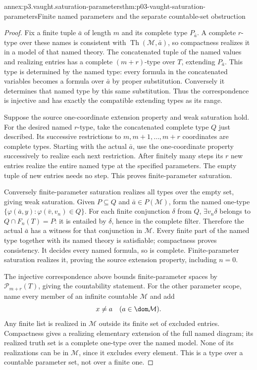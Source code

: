 \begin{annexitem}{annex:p3.vaught.saturation-parameters}{thm:p03-vaught-saturation-parameters}{Finite named parameters and the separate countable-set obstruction}
\begin{proof}
Fix a finite tuple \(\bar a\) of length \(m\) and its complete type
\(P_{\bar a}\). A complete \(r\)-type over these names is consistent
with \(\operatorname{Th}(\mathcal M,\bar a)\), so compactness realizes
it in a model of that named theory. The concatenated tuple of the
named values and realizing entries has a complete \((m+r)\)-type
over \(T\), extending \(P_{\bar a}\).
This type is determined by the named type: every formula in the
concatenated variables becomes a formula over \(\bar a\) by proper
substitution. Conversely it determines that named type by this same
substitution. Thus the correspondence is injective and has exactly
the compatible extending types as its range.

Suppose the source one-coordinate extension property and weak
saturation hold. For the desired named \(r\)-type, take the
concatenated complete type \(Q\) just described.
Its successive restrictions to \(m,m+1,\ldots,m+r\) coordinates
are complete types. Starting with the actual \(\bar a\), use the
one-coordinate property successively to realize each next restriction.
After finitely many steps its \(r\) new entries realize the entire
named type at the specified parameters. The empty tuple of new
entries needs no step. This proves finite-parameter saturation.

Conversely finite-parameter saturation realizes all types over the
empty set, giving weak saturation. Given \(P\subseteq Q\) and
\(\bar a\in P(\mathcal M)\), form the named one-type
\(\{\varphi(\bar a,y):\varphi(\bar v,v_n)\in Q\}\).
For each finite conjunction \(\delta\) from \(Q\),
\(\exists v_n\delta\) belongs to \(Q\cap F_n(T)=P\):
it is entailed by \(\delta\), hence in the complete filter.
Therefore the actual \(\bar a\) has a witness for that conjunction
in \(\mathcal M\).
Every finite part of the named type together with its named theory
is satisfiable; compactness proves consistency. It decides every
named formula, so is complete. Finite-parameter saturation realizes
it, proving the source extension property, including \(n=0\).

The injective correspondence above bounds finite-parameter spaces
by \(\mathcal P_{m+r}(T)\), giving the countability statement.
For the other parameter scope, name every member of an infinite
countable \(\mathcal M\) and add
\[
                         x\ne a\quad(a\in\dom\mathcal M).
\]
Any finite list is realized in \(\mathcal M\) outside its finite
set of excluded entries. Compactness gives a realizing elementary
extension of the full named diagram; its realized truth set is
a complete one-type over the named model. None of its realizations can be in
\(\mathcal M\), since it excludes every element.
This is a type over a countable parameter set, not over a finite one.
\end{proof}
\end{annexitem}

